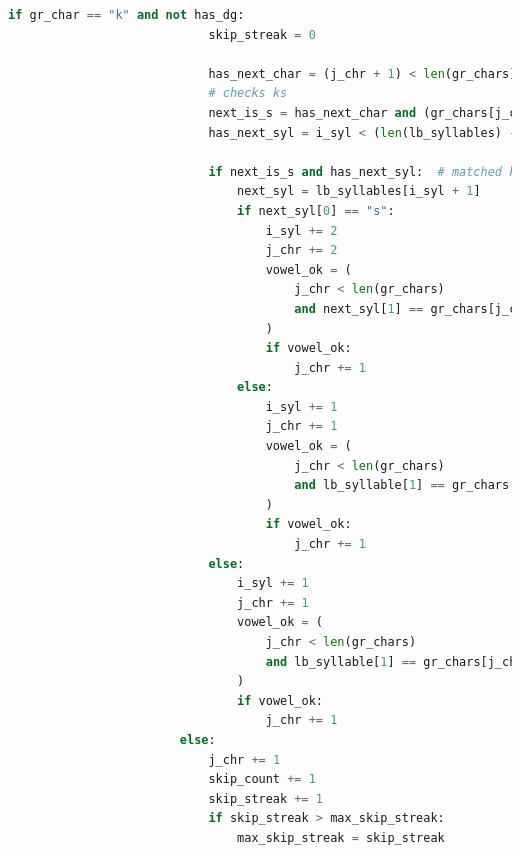 \begin{lstlisting}[language=Python, caption=Brute-Force matching algorithm, breaklines=true, postbreak=\mbox{\hspace{50pt}\textcolor{red}{$\hookrightarrow$}\space}]
                        if gr_char == "k" and not has_dg:
                            skip_streak = 0

                            has_next_char = (j_chr + 1) < len(gr_chars)
                            # checks ks
                            next_is_s = has_next_char and (gr_chars[j_chr + 1] == "s")
                            has_next_syl = i_syl < (len(lb_syllables) - 1)

                            if next_is_s and has_next_syl:  # matched ks
                                next_syl = lb_syllables[i_syl + 1]
                                if next_syl[0] == "s":
                                    i_syl += 2
                                    j_chr += 2
                                    vowel_ok = (
                                        j_chr < len(gr_chars)
                                        and next_syl[1] == gr_chars[j_chr]
                                    )
                                    if vowel_ok:
                                        j_chr += 1
                                else:
                                    i_syl += 1
                                    j_chr += 1
                                    vowel_ok = (
                                        j_chr < len(gr_chars)
                                        and lb_syllable[1] == gr_chars[j_chr]
                                    )
                                    if vowel_ok:
                                        j_chr += 1
                            else:
                                i_syl += 1
                                j_chr += 1
                                vowel_ok = (
                                    j_chr < len(gr_chars)
                                    and lb_syllable[1] == gr_chars[j_chr]
                                )
                                if vowel_ok:
                                    j_chr += 1
                        else:
                            j_chr += 1
                            skip_count += 1
                            skip_streak += 1
                            if skip_streak > max_skip_streak:
                                max_skip_streak = skip_streak


\end{lstlisting}
